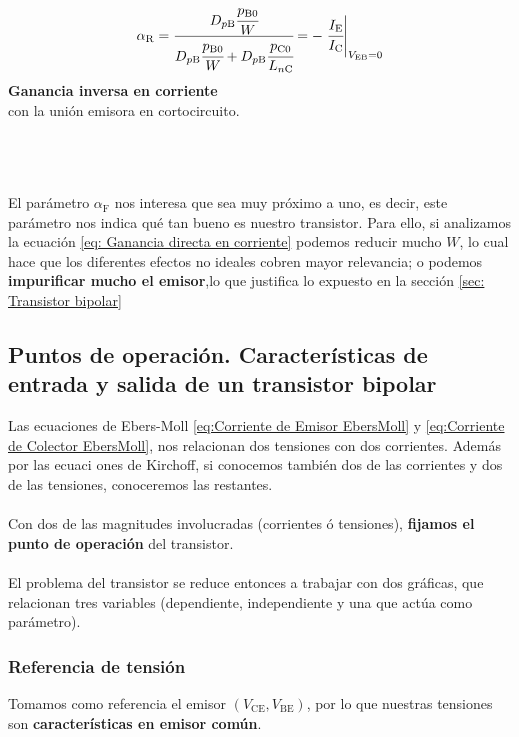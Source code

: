 \hfill
\begin{minipage}{0.5\textwidth}
    \begin{equation}
\alpha_\mathrm{R}=\cfrac{D_{p \mathrm{B}} \cfrac{p_{\mathrm{B} 0}}{W}}{D_{p \mathrm{B}} \cfrac{p_{\mathrm{B} 0}}{W}+D_{p \mathrm{B}} \cfrac{p_{\mathrm{C} 0}}{L_{n\mathrm{C}}}}=-\left. \cfrac{I_\mathrm{E}}{I_\mathrm{C}}\right |_{V_\mathrm{EB}=0}
\label{eq: Ganancia inversa en corriente}
    \end{equation}
    \textbf{Ganancia inversa en corriente} \\ con la unión emisora en cortocircuito.
\end{minipage}
\\\\\\
El parámetro $\alpha_\mathrm{F}$ nos interesa que sea muy próximo a uno, es decir, este parámetro nos indica qué tan bueno es nuestro transistor. Para ello, si analizamos la ecuación \ref{eq: Ganancia directa en corriente} podemos reducir mucho $W$, lo cual hace que los diferentes efectos no ideales cobren mayor relevancia; o podemos \textbf{impurificar mucho el emisor},lo que justifica lo expuesto en la sección \ref{sec: Transistor bipolar}
\subsection{Puntos de operación. Características de entrada y salida de un transistor bipolar}
Las ecuaciones de Ebers-Moll \ref{eq:Corriente de Emisor EbersMoll} y \ref{eq:Corriente de Colector EbersMoll}, nos relacionan dos tensiones con dos corrientes. Además por las ecuaci ones de Kirchoff, si conocemos también dos de las corrientes y dos de las tensiones, conoceremos las restantes.\\\\
Con dos de las magnitudes involucradas (corrientes ó tensiones), \textbf{fijamos el punto de operación} del transistor.\\\\
El problema del transistor se reduce entonces a trabajar con dos gráficas, que relacionan tres variables (dependiente, independiente y una que actúa como parámetro).
\subsubsection{Referencia de tensión}
Tomamos como referencia el emisor $(V_\mathrm{CE},V_\mathrm{BE})$, por lo que nuestras tensiones son \textbf{características en emisor común}.
